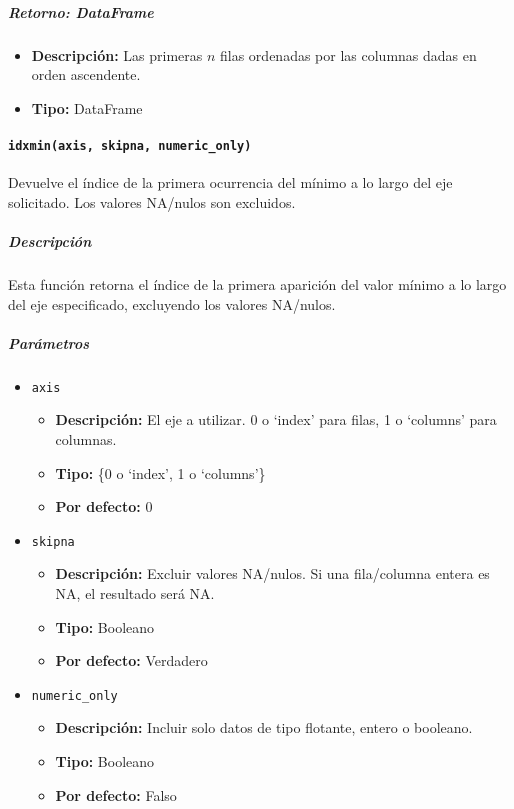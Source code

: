 \subparagraph{\textbf{Retorno:} DataFrame}
\begin{itemize}
    \item \textbf{Descripción:} Las primeras \( n \) filas ordenadas por las
          columnas dadas en orden ascendente.
    \item \textbf{Tipo:} DataFrame
\end{itemize}

\paragraph{\texttt{idxmin(axis, skipna, numeric\_only)}} Devuelve el índice de
la primera ocurrencia del mínimo a lo largo del eje solicitado. Los valores
NA/nulos son excluidos.

\subparagraph{\textbf{Descripción}}
Esta función retorna el índice de la primera aparición del valor mínimo a lo
largo del eje especificado, excluyendo los valores NA/nulos.

\subparagraph{\textbf{Parámetros}}
\begin{itemize}
    \item \texttt{axis}
          \begin{itemize}
              \item \textbf{Descripción:} El eje a utilizar. 0 o `index' para
                    filas, 1 o `columns' para columnas.
              \item \textbf{Tipo:} \{0 o `index', 1 o `columns'\}
              \item \textbf{Por defecto:} 0
          \end{itemize}
    \item \texttt{skipna}
          \begin{itemize}
              \item \textbf{Descripción:} Excluir valores NA/nulos. Si una
                    fila/columna entera es NA, el resultado será NA.
              \item \textbf{Tipo:} Booleano
              \item \textbf{Por defecto:} Verdadero
          \end{itemize}
    \item \texttt{numeric\_only}
          \begin{itemize}
              \item \textbf{Descripción:} Incluir solo datos de tipo flotante,
                    entero o booleano.
              \item \textbf{Tipo:} Booleano
              \item \textbf{Por defecto:} Falso
          \end{itemize}
\end{itemize}

